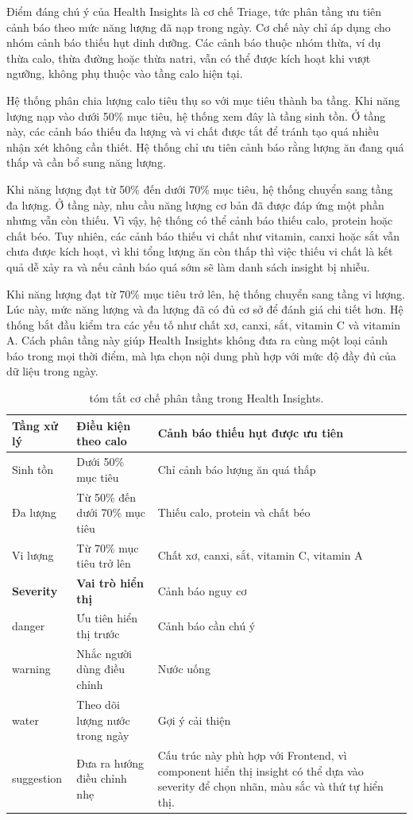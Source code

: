 \documentclass[12pt, a4paper]{report}
\begin{document}
Điểm đáng chú ý của Health Insights là cơ chế Triage, tức phân tầng ưu tiên cảnh báo theo mức năng lượng đã nạp trong ngày. Cơ chế này chỉ áp dụng cho nhóm cảnh báo thiếu hụt dinh dưỡng. Các cảnh báo thuộc nhóm thừa, ví dụ thừa calo, thừa đường hoặc thừa natri, vẫn có thể được kích hoạt khi vượt ngưỡng, không phụ thuộc vào tầng calo hiện tại.

Hệ thống phân chia lượng calo tiêu thụ so với mục tiêu thành ba tầng. Khi năng lượng nạp vào dưới 50\% mục tiêu, hệ thống xem đây là tầng sinh tồn. Ở tầng này, các cảnh báo thiếu đa lượng và vi chất được tắt để tránh tạo quá nhiều nhận xét không cần thiết. Hệ thống chỉ ưu tiên cảnh báo rằng lượng ăn đang quá thấp và cần bổ sung năng lượng.

Khi năng lượng đạt từ 50\% đến dưới 70\% mục tiêu, hệ thống chuyển sang tầng đa lượng. Ở tầng này, nhu cầu năng lượng cơ bản đã được đáp ứng một phần nhưng vẫn còn thiếu. Vì vậy, hệ thống có thể cảnh báo thiếu calo, protein hoặc chất béo. Tuy nhiên, các cảnh báo thiếu vi chất như vitamin, canxi hoặc sắt vẫn chưa được kích hoạt, vì khi tổng lượng ăn còn thấp thì việc thiếu vi chất là kết quả dễ xảy ra và nếu cảnh báo quá sớm sẽ làm danh sách insight bị nhiễu.

Khi năng lượng đạt từ 70\% mục tiêu trở lên, hệ thống chuyển sang tầng vi lượng. Lúc này, mức năng lượng và đa lượng đã có đủ cơ sở để đánh giá chi tiết hơn. Hệ thống bắt đầu kiểm tra các yếu tố như chất xơ, canxi, sắt, vitamin C và vitamin A. Cách phân tầng này giúp Health Insights không đưa ra cùng một loại cảnh báo trong mọi thời điểm, mà lựa chọn nội dung phù hợp với mức độ đầy đủ của dữ liệu trong ngày.
\begin{table}[htbp]
\centering
\caption{tóm tắt cơ chế phân tầng trong Health Insights.}
\begin{tabular}{|p{4cm}|p{4cm}|p{7cm}|}
\hline
\textbf{Tầng xử lý} & \textbf{Điều kiện theo calo} & \textbf{Cảnh báo thiếu hụt được ưu tiên} \\
\hline
Sinh tồn & Dưới 50\% mục tiêu & Chỉ cảnh báo lượng ăn quá thấp \\
\hline
Đa lượng & Từ 50\% đến dưới 70\% mục tiêu & Thiếu calo, protein và chất béo \\
\hline
Vi lượng & Từ 70\% mục tiêu trở lên & Chất xơ, canxi, sắt, vitamin C, vitamin A \\
\hline
\hline
\hline
\textbf{Severity} & \textbf{Vai trò hiển thị} & Cảnh báo nguy cơ \\
\hline
danger & Ưu tiên hiển thị trước & Cảnh báo cần chú ý \\
\hline
warning & Nhắc người dùng điều chỉnh & Nước uống \\
\hline
water & Theo dõi lượng nước trong ngày & Gợi ý cải thiện \\
\hline
suggestion & Đưa ra hướng điều chỉnh nhẹ & Cấu trúc này phù hợp với Frontend, vì component hiển thị insight có thể dựa vào severity để chọn nhãn, màu sắc và thứ tự hiển thị. \\
\hline
\hline
\hline
\hline
\end{tabular}
\end{table}
\end{document}

